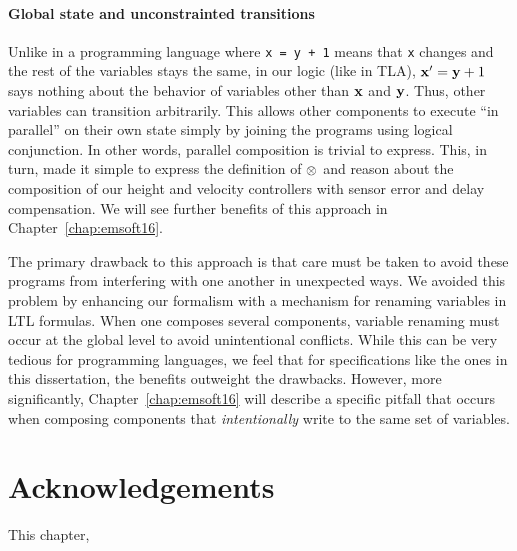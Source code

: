 \paragraph*{Global state and unconstrainted transitions}
Unlike in a programming language where \texttt{x = y + 1} means that
\texttt{x} changes and the rest of the variables stays the same, in our
logic (like in TLA), $\mathbf{x}^\prime = \mathbf{y} + 1$ says nothing about
the behavior of variables other than $\mathbf{x}$ and $\mathbf{y}$. Thus,
other variables can transition arbitrarily.  This allows other components
to execute ``in parallel'' on their own state simply by joining the
programs using logical conjunction. In other words, parallel composition is
trivial to express. This, in turn, made it simple to express the definition
of $\SysConjoinP{}$ and reason about the composition of our height and
velocity controllers with sensor error and delay compensation. We will see
further benefits of this approach in Chapter~\ref{chap:emsoft16}.

The primary drawback to this approach is that care must be taken to avoid
these programs from interfering with one another in unexpected ways.  We
avoided this problem by enhancing our formalism with a mechanism for
renaming variables in LTL formulas. When one composes several components,
variable renaming must occur at the global level to avoid unintentional
conflicts. While this can be very tedious for programming languages, we
feel that for specifications like the ones in this dissertation, the
benefits outweight the drawbacks. However, more significantly,
Chapter~\ref{chap:emsoft16} will describe a specific pitfall that occurs
when composing components that \emph{intentionally} write to the same set
of variables.

\section{Acknowledgements}
This chapter, \memoack{}

